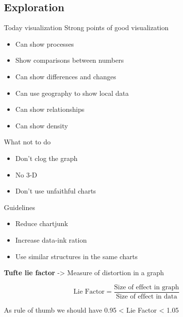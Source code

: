 \subsection{Exploration}

Today visualization
\vspace{10pt}
Strong points of good visualization

\begin{itemize}
    \item Can show processes
    \item Show comparisons between numbers
    \item Can show differences and changes
    \item Can use geography to show local data
    \item Can show relationships
    \item Can show density
\end{itemize}

\vspace{10pt}

What not to do

\begin{itemize}
    \item Don't clog the graph
    \item No 3-D
    \item Don't use unfaithful charts
\end{itemize}

\vspace{10pt}

Guidelines

\begin{itemize}
    \item Reduce chartjunk
    \item Increase data-ink ration
    \item Use similar structures in the same charts
\end{itemize}

\vspace{10pt}

\textbf{Tufte lie factor} -> Measure of distortion in a graph

\begin{equation}
    \text{Lie Factor} = 
    \frac{\text{Size of effect in graph}}
         {\text{Size of effect in data}}
\end{equation}

\vspace{10pt}

As rule of thumb we should have 0.95 < Lie Factor < 1.05

